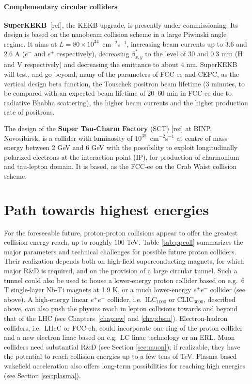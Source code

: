 \paragraph*{Complementary circular colliders}

{\bf SuperKEKB}~[ref], the KEKB upgrade, is presently under commissioning. Its design is based on the nanobeam collision scheme in a large Piwinski angle regime. It aims at $L = 80 \times 10^{34}$~cm$^{-2}$s$^{-1}$, increasing 
beam currents up to 3.6 and 2.6 A ($e^-$ and $e^+$ respectively), decreasing $\beta_{x,y}^{\ast}$  
to the level of 30 and 0.3 mm (H and V respectively) and decreasing the emittance to about 4 nm. 
SuperKEKB will test, and go beyond, many of the parameters of FCC-ee and CEPC, as the vertical design beta function, the Touschek positron beam lifetime (3 minutes, to be compared with an expected beam lifetime of 20--60 min in FCC-ee due to radiative Bhabha scattering), the higher beam currents and the higher production rate of positrons.

The design of the {\bf Super Tau-Charm Factory} (SCT) [ref] at BINP, Novosibirsk, is a collider with luminosity of 
$10^{35}$~cm$^{-2}$s$^{-1}$ at centre of mass energy between 2 GeV and 6 GeV with the possibility to exploit longitudinally polarized electrons at the interaction point (IP), for production of charmonium and tau-lepton domain. It is based, as the FCC-ee on the Crab Waist collision scheme. 



\section{Path towards highest energies}
For the foreseeable future, proton-proton collisions appear to offer the greatest collision-energy reach, up to roughly 100 TeV. Table \ref{tab:ppcoll} summarizes the major parameters and technical challenges for possible future proton colliders. Their realization depends both on high-field superconducting magnets, for which major R\&D is required, and on the provision of a large circular tunnel. Such a tunnel could also be used to house a lower-energy proton collider based on e.g.~6 T single-layer Nb-Ti magnets at 1.9 K, or a much lower-energy $e^+e^-$ collider (see above). A high-energy linear $e^+e^-$ collider, i.e.~ILC$_{1000}$ or CLIC$_{3000}$, described above, can also push the physics reach in lepton collisions towards and beyond that of the LHC (see Chapters~\ref{chap:ew} and \ref{chap:bsm}). Electron-hadron colliders, i.e.~LHeC or FCC-eh, could incorporate one ring of the proton collider and a new electron linac based on e.g.\ LC linac technology or an ERL. Muon colliders need substantial R\&D (see Section \ref{sec:muon}); if realizable, they have the potential to reach collision energies up to a few tens of TeV. Plasma-based wakefield acceleration also offers long-term possibilities for reaching high energies (see Section \ref{sec:plasma}).


